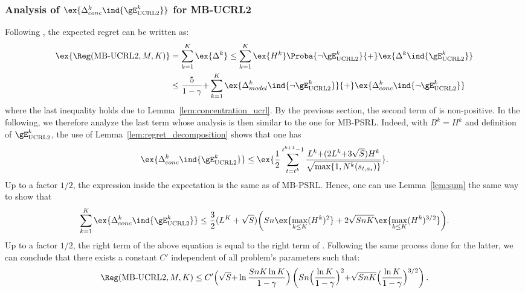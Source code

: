 \begin{subappendices}
\subsubsection{Analysis of \texorpdfstring{$\ex{\Delta_{conc}^k\ind{\gE_\text{UCRL2}^{k}}}$}{} for MB-UCRL2}
Following , the expected regret can be written as:
\begin{align}
    \ex{\Reg(\text{MB-UCRL2},M,K)}
    &= \sum_{k=1}^K \ex{\Delta^k} \le \sum_{k=1}^{K}\ex{H^k}\Proba{\neg \gE_\text{UCRL2}^{k}} {+}\ex{\Delta^k \ind{\gE_\text{UCRL2}^{k}}} \nonumber \\
    &\le \frac{5}{1-\gamma} {+} \sum_{k=1}^{K} \ex{\Delta_{model}^k\ind{\lnot\gE_\text{UCRL2}^{k}}} {+} \ex{\Delta_{conc}^k\ind{\lnot\gE_\text{UCRL2}^{k}}}
    \label{eq:proof_UCRL2_regret}
\end{align}
where the last inequality holds due to Lemma~\ref{lem:concentration_ucrl}.
By the previous section, the second term of  is non-positive.
In the following, we therefore analyze the last term whose analysis is then similar to the one for MB-PSRL.  Indeed, with $B^k=H^k$ and definition of $\gE^{k}_\text{UCRL2}$, the use of Lemma~\ref{lem:regret_decomposition} shows that one has
\begin{align*}
    \ex{\Delta_{conc}^k\ind{\gE^{k}_\text{UCRL2}}} \le \ex{\frac12 \sum_{t=t^k}^{t^{k+1}-1}\frac{L^{k} {+}(2L^{k} {+} 3\sqrt{S}) H^k}{\sqrt{\max\{1,N^{k}(s_{t,a_t})\} }}}.
\end{align*}
Up to a factor $1/2$, the expression inside the expectation is the same as  of MB-PSRL. Hence, one can use Lemma~\ref{lem:sum} the same way to show that
\begin{align*}
    \sum_{k=1}^{K} \ex{\Delta^k_{conc}\ind{\gE^{k}_\text{UCRL2}}}
    \le \frac32(L^K+\sqrt{S})\bigg(Sn\ex{\max_{k\le K}(H^k)^2} +2\sqrt{SnK} \ex{\max_{k\le K}(H^k)^{3/2}}\bigg).
\end{align*}
Up to a factor $1/2$, the right term of the above equation is equal to the right term of . Following the same process done for the latter, we can conclude that there exists a constant $C'$ independent of all problem's parameters such that:
\begin{align*}
    \Reg(\text{MB-UCRL2},M,K) \le C'\Bigl(\sqrt{S}{+}\ln \frac{SnK\ln K}{1-\gamma}\Bigr) \left(Sn\Bigl(\frac{\ln K}{1-\gamma}\Bigr)^{2}
    {+}\sqrt{SnK}\Bigl(\frac{\ln K}{1-\gamma}\Bigr)^{3/2}\right).
\end{align*}



\end{subappendices}
